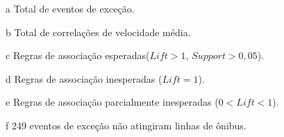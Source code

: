 \documentclass[
	12pt,				%
	oneside,			%
	a4paper,			%
	english,			%
	brazil				%
	]{abntex2ppgsi}
\begin{document}
{{{\begin{apendicesenv}
\begin{table}[!htb]
\begin{threeparttable}
\begin{tablenotes}
            \item[a] Total de eventos de exceção.
            \item[b] Total de correlações de velocidade média.
            \item[c] Regras de associação esperadas($Lift > 1$, $Support > 0,05$).
            \item[d] Regras de associação inesperadas ($Lift = 1$).
            \item[e] Regras de associação parcialmente inesperadas ($0 < Lift < 1$).
            \item[f] 249 eventos de exceção não atingiram linhas de ônibus. 
        \end{tablenotes}
\end{threeparttable}
\end{table}


\end{apendicesenv}}}}
\end{document}
